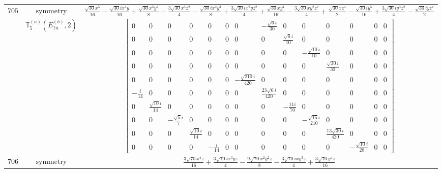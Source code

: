\documentclass[fleqn,8pt,landscape]{jsarticle}
\begin{document}
\begin{longtable}{ccc}
$ 705 $ & $ \text{symmetry} $ & $ \frac{\sqrt{30} x^{5}}{16} - \frac{\sqrt{30} i x^{4} y}{16} + \frac{\sqrt{30} x^{3} y^{2}}{8} - \frac{3 \sqrt{30} x^{3} z^{2}}{4} - \frac{\sqrt{30} i x^{2} y^{3}}{8} + \frac{3 \sqrt{30} i x^{2} y z^{2}}{4} + \frac{\sqrt{30} x y^{4}}{16} - \frac{3 \sqrt{30} x y^{2} z^{2}}{4} + \frac{\sqrt{30} x z^{4}}{2} - \frac{\sqrt{30} i y^{5}}{16} + \frac{3 \sqrt{30} i y^{3} z^{2}}{4} - \frac{\sqrt{30} i y z^{4}}{2} $ \\
$  $ & $ \mathbb{T}_{5}^{(a)}(E_{1u}^{(b)},2) $ & $ \begin{bmatrix} 0 & 0 & 0 & 0 & 0 & 0 & 0 & - \frac{\sqrt{6} i}{30} & 0 & 0 & 0 & 0 & 0 & 0 \\ 0 & 0 & 0 & 0 & 0 & 0 & 0 & 0 & \frac{\sqrt{6} i}{10} & 0 & 0 & 0 & 0 & 0 \\ 0 & 0 & 0 & 0 & 0 & 0 & 0 & 0 & 0 & - \frac{\sqrt{10} i}{10} & 0 & 0 & 0 & 0 \\ 0 & 0 & 0 & 0 & 0 & 0 & 0 & 0 & 0 & 0 & \frac{\sqrt{30} i}{30} & 0 & 0 & 0 \\ 0 & 0 & 0 & 0 & 0 & 0 & - \frac{\sqrt{210} i}{420} & 0 & 0 & 0 & 0 & 0 & 0 & 0 \\ - \frac{i}{14} & 0 & 0 & 0 & 0 & 0 & 0 & \frac{23 \sqrt{6} i}{420} & 0 & 0 & 0 & 0 & 0 & 0 \\ 0 & \frac{\sqrt{10} i}{14} & 0 & 0 & 0 & 0 & 0 & 0 & - \frac{11 i}{70} & 0 & 0 & 0 & 0 & 0 \\ 0 & 0 & - \frac{\sqrt{5} i}{7} & 0 & 0 & 0 & 0 & 0 & 0 & - \frac{\sqrt{15} i}{210} & 0 & 0 & 0 & 0 \\ 0 & 0 & 0 & \frac{\sqrt{10} i}{14} & 0 & 0 & 0 & 0 & 0 & 0 & \frac{13 \sqrt{30} i}{420} & 0 & 0 & 0 \\ 0 & 0 & 0 & 0 & - \frac{i}{14} & 0 & 0 & 0 & 0 & 0 & 0 & - \frac{\sqrt{10} i}{28} & 0 & 0 \end{bmatrix} $ \\ \hline
$ 706 $ & $ \text{symmetry} $ & $ \frac{3 \sqrt{70} x^{4} z}{16} + \frac{3 \sqrt{70} i x^{3} y z}{4} - \frac{9 \sqrt{70} x^{2} y^{2} z}{8} - \frac{3 \sqrt{70} i x y^{3} z}{4} + \frac{3 \sqrt{70} y^{4} z}{16} $ \\

\end{longtable}
\end{document}
